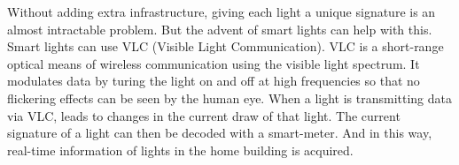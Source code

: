 Without adding extra infrastructure, giving each light a unique signature is an almost intractable problem.
But the advent of smart lights can help with this.
Smart lights can use VLC (Visible Light Communication).
VLC is a short-range optical means of wireless communication using the visible light spectrum.
It modulates data by turing the light on and off at high frequencies so that no flickering effects can be seen by the human eye.
When a light is transmitting data via VLC, leads to changes in the current draw of that light.
The current signature of a light can then be decoded with a smart-meter.
And in this way, real-time information of lights in the home building is acquired.












